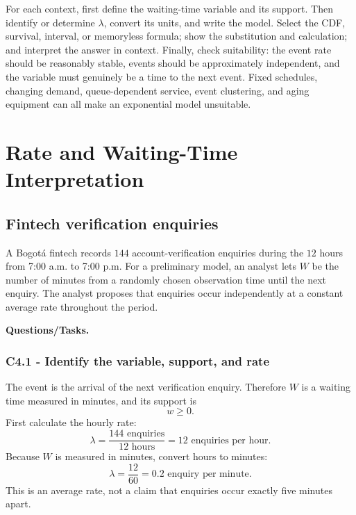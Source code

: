 For each context, first define the waiting-time variable and its support.
Then identify or determine $\lambda$, convert its units, and write the model.
Select the CDF, survival, interval, or memoryless formula; show the
substitution and calculation; and interpret the answer in context.  Finally,
check suitability: the event rate should be reasonably stable, events should
be approximately independent, and the variable must genuinely be a time to
the next event.  Fixed schedules, changing demand, queue-dependent service,
event clustering, and aging equipment can all make an exponential model
unsuitable.

\section{Rate and Waiting-Time Interpretation}\label{sec:c4-rate}

\subsection{Fintech verification enquiries}\label{sec:c4-rate-fintech}
A Bogotá fintech records $144$ account-verification enquiries during the
$12$ hours from 7:00 a.m. to 7:00 p.m.  For a preliminary model, an analyst
lets $W$ be the number of minutes from a randomly chosen observation time
until the next enquiry.  The analyst proposes that enquiries occur
independently at a constant average rate throughout the period.

\textbf{Questions/Tasks.}
\begin{enumerate}
\end{enumerate}

\subsubsection*{C4.1 - Identify the variable, support, and rate}\label{subsec:c4-rate-fintech-a}
The event is the arrival of the next verification enquiry.  Therefore $W$ is
a waiting time measured in minutes, and its support is
\[
 w\geq0.
\]
First calculate the hourly rate:
\[
 \lambda=\frac{144\text{ enquiries}}{12\text{ hours}}
 =12\text{ enquiries per hour}.
\]
Because $W$ is measured in minutes, convert hours to minutes:
\[
 \lambda=\frac{12}{60}=0.2\text{ enquiry per minute}.
\]
This is an average rate, not a claim that enquiries occur exactly five minutes
apart.

